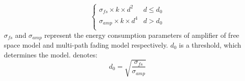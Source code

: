 \documentclass[11pt]{report}
\begin{document}
\begin{itemize}
		\begin{equation}
		\left\{ \begin{array}{ll}
		\sigma_{fs}\times k \times d^2 & d \leq d_0 \\
		\sigma_{amp} \times k \times d^4 & d > d_0 \\
		\end{array} \right.
 		\end{equation}
		$\sigma_{fs}$ and $\sigma_{amp}$ represent the energy consumption parameters of amplifier of free space model and multi-path fading model respectively. $d_0$ is a threshold, which determines the model. 
		\cite{Chunyao2013AnEB} denotes:\\
		\begin{equation}
		d_0 = \sqrt{\frac{\sigma_{fs}}{\sigma_{amp}}}
		\end{equation}	
	\end{itemize}
\end{document}
